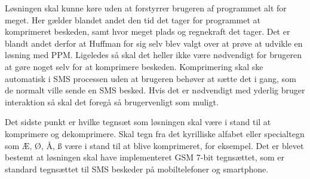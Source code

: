 Løsningen skal kunne køre uden at forstyrrer brugeren af programmet alt for meget. Her gælder blandet andet den tid det tager for programmet at komprimeret beskeden, samt hvor meget plads og regnekraft det tager. Det er blandt andet derfor at Huffman for sig selv blev valgt over at prøve at udvikle en løsning med PPM. Ligeledes så skal det heller ikke være nødvendigt for brugeren at gøre noget selv for at komprimere beskeden. Komprimering skal ske automatisk i SMS processen uden at brugeren behøver at sætte det i gang, som de normalt ville sende en SMS besked. Hvis det er nødvendigt med yderlig bruger interaktion så skal det foregå så brugervenligt som muligt.

Det sidste punkt er hvilke tegnsæt som løsningen skal være i stand til at komprimere og dekomprimere. Skal tegn fra det kyrilliske alfabet eller specialtegn som Æ, Ø, Å, ß være i stand til at blive komprimeret, for eksempel. Det er blevet bestemt at løsningen skal have implementeret GSM 7-bit tegnsættet, som er standard tegnsættet til SMS beskeder på mobiltelefoner og smartphone.